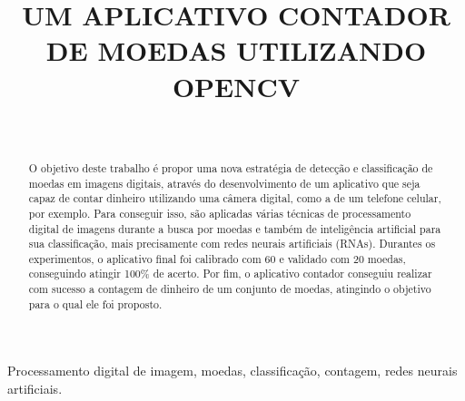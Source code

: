 \documentclass[10pt,journal,compsoc]{IEEEtran}
\begin{document}
\title{UM APLICATIVO CONTADOR DE MOEDAS UTILIZANDO OPENCV}

\author{
	\and \\
}

\maketitle

\begin{abstract}
O objetivo deste trabalho é propor uma nova estratégia de detecção e classificação de moedas em imagens digitais, através do desenvolvimento de um aplicativo que seja capaz de contar dinheiro utilizando uma câmera digital, como a de um telefone celular, por exemplo. Para conseguir isso, são aplicadas várias técnicas de processamento digital de imagens durante a busca por moedas e também de inteligência artificial para sua classificação, mais precisamente com redes neurais artificiais (RNAs). Durantes os experimentos, o aplicativo final foi calibrado com 60 e validado com 20 moedas, conseguindo atingir 100\% de acerto. Por fim, o aplicativo contador conseguiu realizar com sucesso a contagem de dinheiro de um conjunto de moedas, atingindo o objetivo para o qual ele foi proposto. 
\end{abstract}

\begin{IEEEkeywords}
Processamento digital de imagem, moedas, classificação, contagem, redes neurais artificiais.
\end{IEEEkeywords}


%
\end{document}

